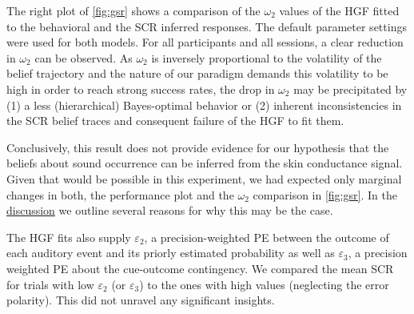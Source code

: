 \documentclass{article}
\begin{document}
\begin{multicols}{2}
The right plot of \autoref{fig:gsr} shows a comparison of the $\omega_2$ values of the HGF fitted to the behavioral and the SCR inferred responses. The default parameter settings were used for both models. For all participants and all sessions, a clear reduction in $\omega_2$ can be observed. As $\omega_2$ is inversely proportional to the volatility of the belief trajectory and the nature of our paradigm demands this volatility to be high in order to reach strong success rates, the drop in $\omega_2$ may be precipitated by (1) a less (hierarchical) Bayes-optimal behavior or (2) inherent inconsistencies in the SCR belief traces and consequent failure of the HGF to fit them.

Conclusively, this result does not provide evidence for our hypothesis that the beliefs about sound occurrence can be inferred from the skin conductance signal. Given that would be possible in this experiment, we had expected only marginal changes in both, the performance plot and the $\omega_2$ comparison in \autoref{fig:gsr}. In the \hyperref[sec:discuss]{discussion} we outline several reasons for why this may be the case.

The HGF fits also supply $\varepsilon_2$, a precision-weighted PE between the outcome of each auditory event and its priorly estimated probability as well as $\varepsilon_3$, a precision weighted PE  about the cue-outcome contingency. We compared the mean SCR for trials with low $\varepsilon_2$ (or $\varepsilon_3$) to the ones with high values (neglecting the error polarity). This did not unravel any significant insights.





\end{multicols}
\end{document}
